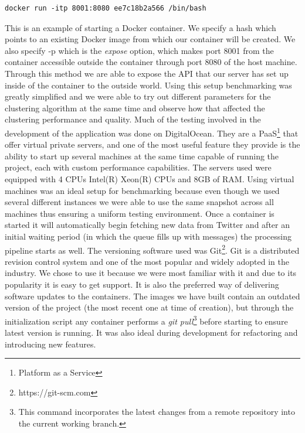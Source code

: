 \begin{lstlisting}[caption=Starting a Docker container, label=run_docker_container]
docker run -itp 8001:8080 ee7c18b2a566 /bin/bash
\end{lstlisting}
This is an example of starting a Docker container. We specify a hash which points to an existing Docker image from which our container will be created. We also specify -p which is the \textit{expose} option, which makes port 8001 from the container accessible outside the container through port 8080 of the host machine. Through this method we are able to expose the API that our server has set up inside of the container to the outside world.
\newline
Using this setup benchmarking was greatly simplified and we were able to try out different parameters for the clustering algorithm at the same time and observe how that affected the clustering performance and quality.
Much of the testing involved in the development of the application was done on DigitalOcean. They are a PaaS\footnote{Platform as a Service} that offer virtual private servers, and one of the most useful feature they provide is the ability to start up several machines at the same time capable of running the project, each with custom performance capabilities. The servers used were equipped with 4 CPUs Intel(R) Xeon(R) CPUs and 8GB of RAM. Using virtual machines was an ideal setup for benchmarking because even though we used several different instances we were able to use the same snapshot across all machines thus ensuring a uniform testing environment. Once a container is started it will automatically begin fetching new data from Twitter and after an initial waiting period (in which the queue fills up with messages) the processing pipeline starts as well.
\newline
\newline
The versioning software used was Git\footnote{https://git-scm.com}. Git is a distributed revision control system and one of the most popular and widely adopted in the industry. We chose to use it because we were most familiar with it and due to its popularity it is easy to get support. It is also the preferred way of delivering software updates to the containers. The images we have built contain an outdated version of the project (the most recent one at time of creation), but through the initialization script any container performs a \textit{git pull}\footnote{This command incorporates the latest changes from a remote repository into the current working branch.} before starting {\project}  to ensure latest version is running. It was also ideal during development for refactoring and introducing new features.

